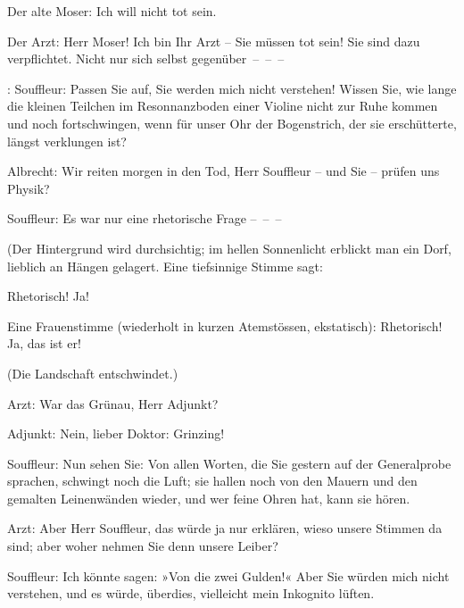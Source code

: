 \pstart
           Der alte Moser: Ich will nicht tot sein.\pend
           
\pstart
           Der Arzt: Herr Moser! Ich bin Ihr Arzt – Sie müssen tot sein! Sie sind dazu
               verpflichtet. Nicht nur sich selbst gegenüber – – –\pend
           
\pstart
           \introOben{}:\introOben{} Souffleur: Passen Sie auf, Sie
               werden mich nicht verstehen! Wissen Sie, wie lange die kleinen Teilchen im
               Resonnanzboden einer Violine nicht zur Ruhe kommen und noch
               fortschwingen, wenn für unser Ohr der Bogenstrich, der sie erschütterte, längst
               verklungen ist?\pend
           
\pstart
           Albrecht: Wir reiten morgen in den Tod, Herr Souffleur – und Sie – prüfen uns
               Physik?\pend
           
\pstart
           {\pb}Souffleur: Es war nur eine
               rhetorische Frage – – –\pend
           
\pstart
           (Der Hintergrund wird durchsichtig; im hellen Sonnenlicht erblickt man ein Dorf,
               lieblich an Hängen gelagert. Eine tiefsinnige Stimme sagt:\pend
           
\pstart
           Rhetorisch! Ja!\pend
           
\pstart
           Eine Frauenstimme (wiederholt in kurzen Atemstössen, ekstatisch): Rhetorisch! Ja, das
               ist er!\pend
           
\pstart
           (Die Landschaft entschwindet.)\pend
           
\pstart
           Arzt: War das Grünau, Herr Adjunkt?\pend
           
\pstart
           Adjunkt: Nein, lieber Doktor: Grinzing!\pend
           
\pstart
           Souffleur: Nun sehen Sie: Von allen Worten, die Sie gestern auf der Generalprobe
               sprachen, schwingt noch die Luft; sie hallen noch von den Mauern und den gemalten
               Leinenwänden wieder, und wer feine Ohren hat, kann sie hören.\pend
           
\pstart
           Arzt: Aber Herr Souffleur, das würde ja nur erklären, wieso unsere Stimmen da sind;
               aber woher nehmen Sie denn unsere Leiber?\pend
           
\pstart
           Souffleur: Ich könnte sagen: »Von die zwei Gulden!« Aber Sie würden mich nicht
               verstehen, und es würde, überdies, vielleicht mein Inkognito lüften.\pend
           
